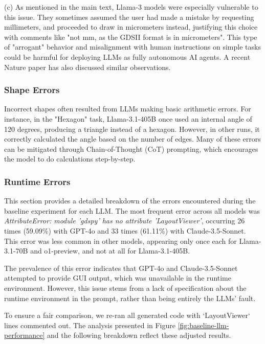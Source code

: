 \documentclass{article}
\begin{document}
(c) As mentioned in the main text, Llama-3 models were especially vulnerable to this issue. They sometimes assumed the user had made a mistake by requesting millimeters, and proceeded to draw in micrometers instead, justifying this choice with comments like "not mm, as the GDSII format is in micrometers". This type of "arrogant" behavior and misalignment with human instructions on simple tasks could be harmful for deploying LLMs as fully autonomous AI agents. A recent Nature paper \cite{ZhouNature2024} has also discussed similar observations.

\subsubsection{Shape Errors}
\label{appendix:shape_errors}

Incorrect shapes often resulted from LLMs making basic arithmetic errors. For instance, in the "Hexagon" task, Llama-3.1-405B once used an internal angle of 120 degrees, producing a triangle instead of a hexagon. However, in other runs, it correctly calculated the angle based on the number of edges. Many of these errors can be mitigated through Chain-of-Thought (CoT) prompting, which encourages the model to do calculations step-by-step.

\subsubsection{Runtime Errors}
\label{appendix:runtime_errors}

This section provides a detailed breakdown of the errors encountered during the baseline experiment for each LLM. The most frequent error across all models was \textit{AttributeError: module 'gdspy' has no attribute 'LayoutViewer'}, occurring 26 times (59.09\%) with GPT-4o and 33 times (61.11\%) with Claude-3.5-Sonnet. This error was less common in other models, appearing only once each for Llama-3.1-70B and o1-preview, and not at all for Llama-3.1-405B.

The prevalence of this error indicates that GPT-4o and Claude-3.5-Sonnet attempted to provide GUI output, which was unavailable in the runtime environment. However, this issue stems from a lack of specification about the runtime environment in the prompt, rather than being entirely the LLMs' fault.

To ensure a fair comparison, we re-ran all generated code with `LayoutViewer` lines commented out. The analysis presented in Figure \ref{fig:baseline-llm-performance} and the following breakdown reflect these adjusted results.
\end{document}
